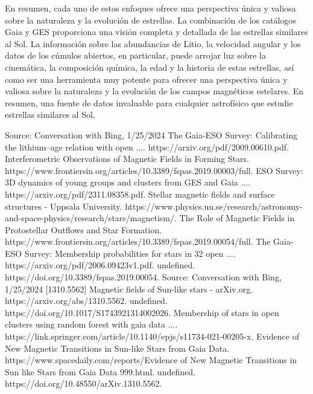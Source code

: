 En resumen, cada uno de estos enfoques ofrece una perspectiva única y valiosa sobre la naturaleza y la evolución de estrellas. La combinación de los catálogos Gaia y GES proporciona una visión completa y detallada de las estrellas similares al Sol. La información sobre las abundancias de Litio, la velocidad angular y los datos de los cúmulos abiertos, en particular, puede arrojar luz sobre la cinemática, la composición química, la edad y la historia de estas estrellas, así como ser una herramienta muy potente para ofrecer una perspectiva única y valiosa sobre la naturaleza y la evolución de los campos magnéticos estelares.  En resumen, una fuente de datos invaluable para cualquier astrofísico que estudie estrellas similares al Sol.\par





Source: Conversation with Bing, 1/25/2024
The Gaia-ESO Survey: Calibrating the lithium–age relation with open .... https://arxiv.org/pdf/2009.00610.pdf.
Interferometric Observations of Magnetic Fields in Forming Stars. https://www.frontiersin.org/articles/10.3389/fspas.2019.00003/full.
ESO Survey: 3D dynamics of young groups and clusters from GES and Gaia .... https://arxiv.org/pdf/2311.08358.pdf.
Stellar magnetic fields and surface structures - Uppsala University. https://www.physics.uu.se/research/astronomy-and-space-physics/research/stars/magnetism/.
The Role of Magnetic Fields in Protostellar Outflows and Star Formation. https://www.frontiersin.org/articles/10.3389/fspas.2019.00054/full.
The Gaia-ESO Survey: Membership probabilities for stars in 32 open .... https://arxiv.org/pdf/2006.09423v1.pdf.
undefined. https://doi.org/10.3389/fspas.2019.00054.
Source: Conversation with Bing, 1/25/2024
[1310.5562] Magnetic fields of Sun-like stars - arXiv.org. https://arxiv.org/abs/1310.5562.
undefined. https://doi.org/10.1017/S1743921314002026.
Membership of stars in open clusters using random forest with gaia data .... https://link.springer.com/article/10.1140/epjs/s11734-021-00205-x.
Evidence of New Magnetic Transitions in Sun-like Stars from Gaia Data. https://www.spacedaily.com/reports/Evidence of New Magnetic Transitions in Sun like Stars from Gaia Data 999.html.
undefined. https://doi.org/10.48550/arXiv.1310.5562.


\endinput
